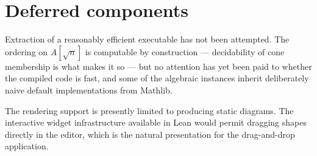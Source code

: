\section{Deferred components}


Extraction of a reasonably efficient executable has not been attempted. The
ordering on $A[\sqrt{n}]$ is computable by construction --- decidability of cone
membership is what makes it so --- but no attention has yet been paid to whether
the compiled code is fast, and some of the algebraic instances inherit
deliberately naive default implementations from Mathlib.

The rendering support is presently limited to producing static diagrams. The
interactive widget infrastructure available in Lean would permit dragging shapes
directly in the editor, which is the natural presentation for the drag-and-drop
application.

